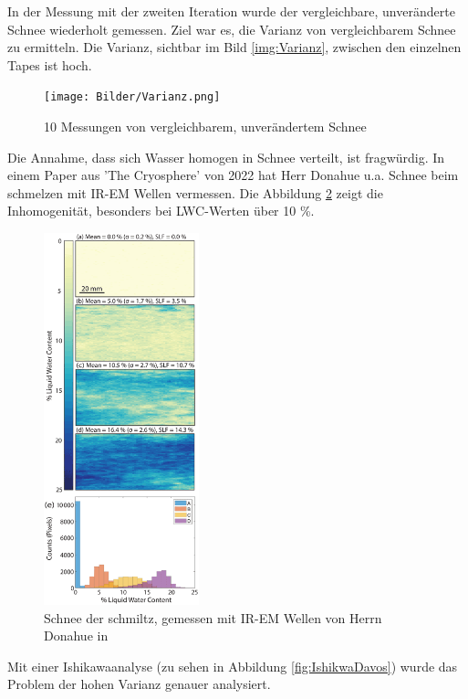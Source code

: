 In der Messung mit der zweiten Iteration wurde der vergleichbare, unveränderte Schnee wiederholt gemessen. Ziel war es, die Varianz von vergleichbarem Schnee zu ermitteln. Die Varianz, sichtbar im Bild \ref{img:Varianz}, zwischen den einzelnen Tapes ist hoch.

\begin{figure}[H]
    \centering
    \texttt{[image: Bilder/Varianz.png]}
    \caption{10 Messungen von vergleichbarem, unverändertem Schnee}
    \label{fig:Varianz}
\end{figure}


Die Annahme, dass sich Wasser homogen in Schnee verteilt, ist fragwürdig. In einem Paper aus 'The Cryosphere' von 2022 \cite{Donahue.2022} hat Herr Donahue u.a. Schnee beim schmelzen mit IR-EM Wellen vermessen. Die Abbildung \ref{fig:IRPaper} zeigt die Inhomogenität, besonders bei LWC-Werten über 10 \%.

\begin{figure}[H]
    \centering
    \includegraphics[width=0.4\textwidth]{Bilder/tc-16-43-2022-f08-thumb.png}
    \caption{Schnee der schmiltz, gemessen mit IR-EM Wellen von Herrn Donahue in \cite{Donahue.2022}}
    \label{fig:IRPaper}
\end{figure}



Mit einer Ishikawaanalyse (zu sehen in Abbildung \ref{fig:IshikwaDavos}) wurde das Problem der hohen Varianz genauer analysiert.


